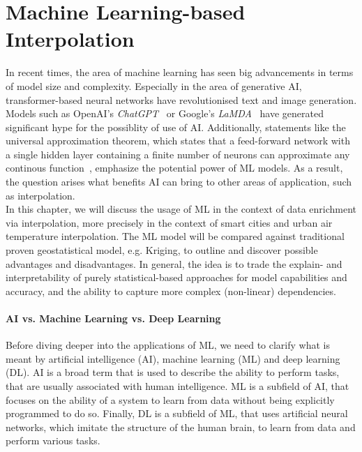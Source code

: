 \chapter{Machine Learning-based Interpolation}
\label{chap:Machine Learning based Interpolation}

In recent times, the area of machine learning has seen big advancements in terms of model size and complexity. Especially in the area of generative AI, transformer-based neural networks have revolutionised text and image generation. Models such as OpenAI's \textit{ChatGPT}~\cite{openai2023gpt4} or Google's \textit{LaMDA}~\cite{thoppilan2022lamda} have generated significant hype for the possiblity of use of AI\@. Additionally, statements like the universal approximation theorem, which states that a feed-forward network with a single hidden layer containing a finite number of neurons can approximate any continous function~\cite{hornik1989multilayer}, emphasize the potential power of ML models. As a result, the question arises what benefits AI can bring to other areas of application, such as interpolation.\\
In this chapter, we will discuss the usage of ML in the context of data enrichment via interpolation, more precisely in the context of smart cities and urban air temperature interpolation. The ML model will be compared against traditional proven geostatistical model, e.g. Kriging, to outline and discover possible advantages and disadvantages. In general, the idea is to trade the explain- and interpretability of purely statistical-based approaches for model capabilities and accuracy, and the ability to capture more complex (non-linear) dependencies.

\subsubsection{AI vs. Machine Learning vs. Deep Learning}

Before diving deeper into the applications of ML, we need to clarify what is meant by artificial intelligence (AI), machine learning (ML) and deep learning (DL). AI is a broad term that is used to describe the ability to perform tasks, that are usually associated with human intelligence. ML is a subfield of AI, that focuses on the ability of a system to learn from data without being explicitly programmed to do so. Finally, DL is a subfield of ML, that uses artificial neural networks, which imitate the structure of the human brain, to learn from data and perform various tasks.

